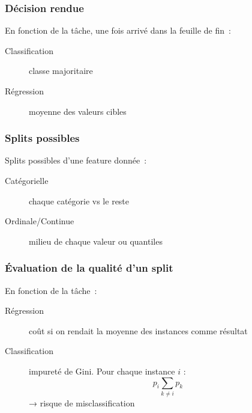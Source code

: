 \documentclass{formation}
\begin{document}
\begin{frame}
  \frametitle{Décision rendue}
  
  En fonction de la tâche, une fois arrivé dans la feuille de fin :
  \begin{description}
  \item[Classification] classe majoritaire
  \item[Régression] moyenne des valeurs cibles
  \end{description}
\end{frame}

\begin{frame}
  \frametitle{Splits possibles}

  Splits possibles d'une feature donnée :

  \begin{description}
  \item[Catégorielle] chaque catégorie vs le reste
  \item[Ordinale/Continue] milieu de chaque valeur \green{(!!!)} ou
    quantiles
  \end{description}
\end{frame}

\begin{frame}
  \frametitle{Évaluation de la qualité d'un split}

  En fonction de la tâche :

  \begin{description}
  \item[Régression] coût si on rendait la moyenne des instances
    comme résultat
  \item[Classification] impureté de Gini. Pour chaque instance $i$ :
    \[
      p_i\sum_{k\neq i} p_k
    \]
    → risque de misclassification
  \end{description}
\end{frame}
\end{document}
